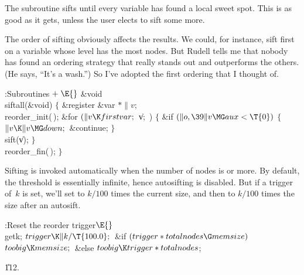The  subroutine sifts until every variable
has found
a local sweet spot. This is as good as it gets, unless the user elects
to sift some more.

The order of sifting obviously affects the results. We could, for instance,
sift first on a variable whose level has the most nodes. But Rudell tells me
that nobody has found an ordering strategy that really stands out
and outperforms the others. (He says, ``It's a wash.'') So I've adopted
the first ordering that I thought of.

\Y\B\4:Subroutines\X${}\mathrel+\E{}$\6
\&{void} \\{siftall}(\&{void})\1\1\2\2\6
${}\{{}$\1\6
\&{register} \&{var} ${}{*}\|v;{}$\7
\\{reorder\_init}(\,);\6
\&{for} ${}(\|v\K\\{firstvar};{}$ \|v; \,)\5
${}\{{}$\1\6
\&{if} ${}(\|o,\39\|v\MG\\{aux}<\T{0}){}$\5
${}\{{}$\1\6
${}\|v\K\|v\MG\\{down};{}$\6
\&{continue};\6
\4${}\}{}$\2\6
\\{sift}(\|v);\6
\4${}\}{}$\2\6
\\{reorder\_fin}(\,);\6
\4${}\}{}$\2\par
\fi

Sifting is invoked automatically when the number of nodes
is
 or more. By default, the  threshold is
essentially
infinite, hence autosifting is disabled. But if a trigger of~$k$
is set, we'll set  to $k/100$ times the current size,
and then to $k/100$ times the size after an autosift.

\Y\B\4:Reset the reorder trigger\X${}\E{}$\6
\\{getk};\6
${}\\{trigger}\K\|k/\T{100.0};{}$\6
\&{if} ${}(\\{trigger}*\\{totalnodes}\G\\{memsize}){}$\1\5
${}\\{toobig}\K\\{memsize};{}$\2\6
\&{else}\1\5
${}\\{toobig}\K\\{trigger}*\\{totalnodes}{}$;\2\par
\U112.\fi


